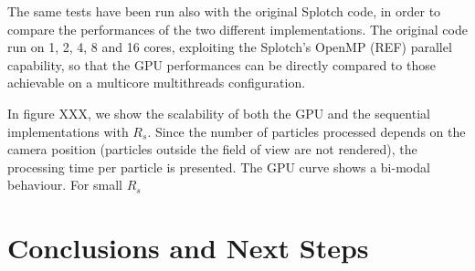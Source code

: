 \documentclass[11pt]{article}
\begin{document}
The same tests have been run also with the original Splotch code, in order 
to compare the performances of the two different implementations. The original 
code run on 1, 2, 4, 8 and 16 cores, exploiting the Splotch's OpenMP (REF) parallel
capability, so that the GPU performances can be directly compared to 
those achievable on a multicore multithreads configuration.  

In figure XXX, we show the scalability of both the GPU and the sequential 
implementations with $R_s$. Since the number of particles processed depends on
the camera position (particles outside the field of view are not rendered), 
the processing time per particle is presented. The GPU curve shows a 
bi-modal behaviour. For small $R_s$  

\section{Conclusions and Next Steps}
\end{document}
